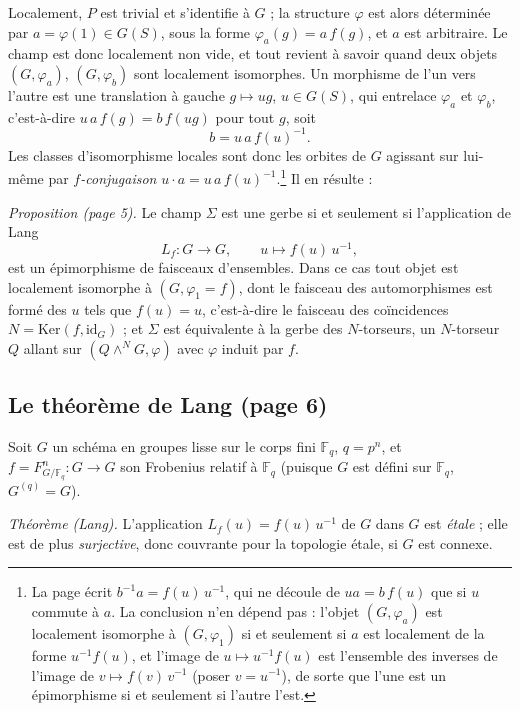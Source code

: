 \documentclass[11pt,a4paper]{article}
\begin{document}
Localement, $P$ est trivial et s'identifie à $G$ ; la structure $\varphi$ est
alors déterminée par $a = \varphi(1) \in G(S)$, sous la forme $\varphi_a(g) =
a\,f(g)$, et $a$ est arbitraire. Le champ est donc localement non vide, et
tout revient à savoir quand deux objets $(G, \varphi_a)$, $(G, \varphi_b)$
sont localement isomorphes. Un morphisme de l'un vers l'autre est une
translation à gauche $g \mapsto ug$, $u \in G(S)$, qui entrelace $\varphi_a$ et
$\varphi_b$, c'est-à-dire $u\,a\,f(g) = b\,f(ug)$ pour tout $g$, soit
\[
b = u\,a\,f(u)^{-1}.
\]
Les classes d'isomorphisme locales sont donc les orbites de $G$ agissant sur
lui-même par \emph{$f$-conjugaison} $u \cdot a = u\,a\,f(u)^{-1}$.\footnote{La
page écrit $b^{-1}a = f(u)\,u^{-1}$, qui ne découle de $ua = b\,f(u)$ que si
$u$ commute à $a$. La conclusion n'en dépend pas : l'objet $(G, \varphi_a)$ est
localement isomorphe à $(G, \varphi_1)$ si et seulement si $a$ est
localement de la forme $u^{-1}f(u)$, et l'image de $u \mapsto u^{-1}f(u)$ est
l'ensemble des inverses de l'image de $v \mapsto f(v)\,v^{-1}$ (poser $v =
u^{-1}$), de sorte que l'une est un épimorphisme si et seulement si l'autre
l'est.} Il en résulte :

\emph{Proposition (page 5).} Le champ $\Sigma$ est une gerbe si et seulement si
l'application de Lang
\[
L_f : G \longrightarrow G, \qquad u \longmapsto f(u)\,u^{-1},
\]
est un épimorphisme de faisceaux d'ensembles. Dans ce cas tout objet est
localement isomorphe à $(G, \varphi_1 = f)$, dont le faisceau des
automorphismes est formé des $u$ tels que $f(u) = u$, c'est-à-dire le faisceau
des coïncidences $N = \mathrm{Ker}(f, \mathrm{id}_G)$ ; et $\Sigma$ est
équivalente à la gerbe des $N$-torseurs, un $N$-torseur $Q$ allant sur
$(Q \wedge^{N} G, \varphi)$ avec $\varphi$ induit par $f$.

\subsection*{Le théorème de Lang (page 6)}

Soit $G$ un schéma en groupes lisse sur le corps fini $\mathbb{F}_q$, $q =
p^{n}$, et $f = F^{n}_{G/\mathbb{F}_q} : G \to G$ son Frobenius relatif à
$\mathbb{F}_q$ (puisque $G$ est défini sur $\mathbb{F}_q$, $G^{(q)} = G$).

\emph{Théorème (Lang).} L'application $L_f(u) = f(u)\,u^{-1}$ de $G$ dans $G$
est \emph{étale} ; elle est de plus \emph{surjective}, donc couvrante pour la
topologie étale, si $G$ est connexe.
\end{document}
